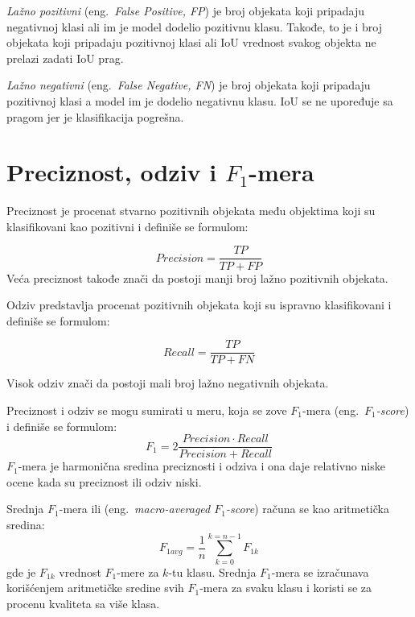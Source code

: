 \documentclass[12pt,oneside]{memoir}
\begin{document}
\textit{Lažno pozitivni} (eng.~\textit{False Positive, FP}) je broj objekata koji pripadaju negativnoj klasi ali im je model dodelio pozitivnu klasu. Takođe, to je i broj objekata koji pripadaju pozitivnoj klasi ali IoU vrednost svakog objekta ne prelazi zadati IoU prag.

\textit{Lažno negativni} (eng.~\textit{False Negative, FN}) je broj objekata koji pripadaju pozitivnoj klasi a model im je dodelio negativnu klasu. IoU se ne upoređuje sa pragom jer je klasifikacija pogrešna. 

\section{Preciznost, odziv i \texorpdfstring{$F_1$}{TEXT}-mera}
Preciznost je procenat stvarno pozitivnih objekata među objektima koji su klasifikovani kao pozitivni i definiše se formulom:

\begin{equation}
    Precision = \frac{TP}{TP+FP}
\end{equation}
Veća preciznost takođe znači da postoji manji broj lažno pozitivnih objekata.

Odziv predstavlja procenat pozitivnih objekata koji su ispravno klasifikovani i definiše se formulom:

\begin{equation}
    Recall = \frac{TP}{TP+FN}
\end{equation}

Visok odziv znači da postoji mali broj lažno negativnih objekata.

Preciznost i odziv se mogu sumirati u meru, koja se zove $F_1$-mera (eng.~\textit{$F_1$-score}) \cite{sasaki2007truth} i definiše se formulom:
\begin{equation}
\label{eq:f1}
    F_1 = 2\frac{Precision \cdot Recall}{Precision+Recall}
\end{equation}
$F_1$-mera je harmonična sredina preciznosti i odziva i ona daje relativno niske ocene kada su preciznost ili odziv niski. 

Srednja $F_1$-mera ili (eng.~\textit{macro-averaged $F_1$-score}) računa se kao aritmetička sredina:
\begin{equation}
\label{eq:f1a}
    F_{1avg} = \frac{1}{n}\sum_{k=0}^{k=n-1} F_{1k}
\end{equation}
gde je \(F_{1k}\) vrednost $F_1$-mere za \(k\)-tu klasu. Srednja $F_1$-mera se izračunava korišćenjem aritmetičke sredine svih $F_1$-mera za svaku klasu i koristi se za procenu kvaliteta sa više klasa.
\end{document}
